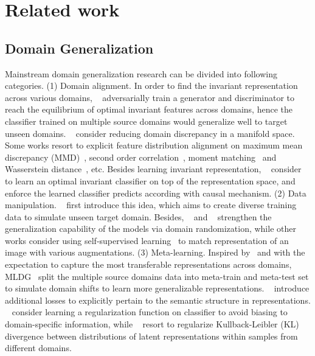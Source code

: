\documentclass{article}
\begin{document}
\section{Related work}\label{sec:related-work}

\subsection{Domain Generalization}
Mainstream domain generalization research can be divided into following categories.
(1) {Domain alignment}. In order to find the invariant representation across various domains, ~\citet{ganin2016domain} adversarially train a generator and discriminator to reach the equilibrium of optimal invariant features across domains, hence the classifier trained on multiple source domains would generalize well to target unseen domains. ~\citet{gong2019dlow} consider reducing domain discrepancy in a manifold space.
Some works resort to explicit feature distribution alignment on maximum mean discrepancy (MMD)~\citep{pan2010domain,tzeng2014deep,wang2018visual}, second order correlation~\citep{sun2016return,sun2016deep,peng2018synthetic}, moment matching~\citep{peng2019moment} and Wasserstein distance~\citep{zhou2020domain,lyu2021barycentric}, etc. Besides learning invariant representation, ~\citet{arjovsky2019invariant} consider to learn an optimal invariant classifier on top of the representation space, and enforce the learned classifier predicts according with causal mechanism.
(2) {Data manipulation}. ~\citet{tobin2017domain} first introduce this idea, which aims to create diverse training data to simulate unseen target domain. Besides, ~\citet{peng2018sim} and ~\citet{tremblay2018training} strengthen the generalization capability of the models via domain randomization, while other works consider using self-supervised learning~\citep{carlucci2019domain,kim2021selfreg} to match representation of an image with various augmentations. 
(3) {Meta-learning}. Inspired by~\citet{finn2017model} and with the expectation to capture the most transferable representations across domains, MLDG~\citep{li2018learning} split the multiple source domains data into meta-train and meta-test set to simulate domain shifts to learn more generalizable representations. 
~\citet{dou2019domain} introduce additional losses to explicitly pertain to the semantic structure in representations. 
~\citet{balaji2018metareg} consider learning a regularization function on classifier to avoid biasing to domain-specific information, while ~\citet{du2020learning} resort to regularize Kullback-Leibler (KL) divergence between distributions of latent representations within samples from different domains. 
\end{document}
